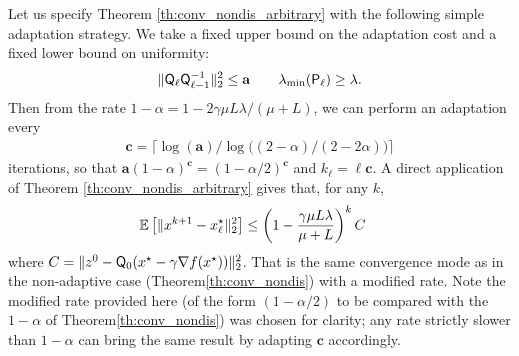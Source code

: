 \begin{example} \label{ex:adapt_fixed}
Let us specify Theorem \eqref{th:conv_nondis_arbitrary} with the following simple adaptation strategy. We take a fixed upper bound on the adaptation cost and a fixed lower bound on uniformity:
\begin{equation}\label{eq:explicit}
\|  {\mathsf{Q}}_\ell   {\mathsf{Q}}_{\ell-1}^{-1} \|_2^2 \leq \mathbf{a} \qquad
\lambda_{ \min}({\mathsf{P}}_{\ell}) \geq \lambda.
\end{equation}
Then from the rate $1-\alpha = 1- 2\gamma\mu L\lambda/(\mu+L)$, we can perform an adaptation every 
\begin{align}
    \label{eq:min_adapt}
\mathbf{c} = \lceil \log(\mathbf{a})/\log\big((2-\alpha)/(2-2\alpha)\big)\rceil
\end{align}
 iterations, so that $\mathbf{a}(1-\alpha)^\mathbf{c} = (1-\alpha/2)^\mathbf{c}$ and $k_\ell = \ell \mathbf{c}$. A direct application of Theorem \eqref{th:conv_nondis_arbitrary} gives that, for any $k$,
 \begin{align*}
    \mathbb{E}\left[\|x^{k+1}-x^{\star}_{\ell}\|_2^2\right] &\leq  \left(1-\frac{\gamma\mu L\lambda}{\mu+L}\right)^{k}  C
\end{align*}
where $C = \|z^0 - {\mathsf{Q}}_0(x^\star - \gamma\nabla f(x^\star))\|_2^2$. That is the same convergence mode as in the non-adaptive case (Theorem\;\ref{th:conv_nondis}) with a modified rate. Note the modified rate provided here (of the form $(1-\alpha/2)$ to be compared with the $1-\alpha$ of Theorem\;\ref{th:conv_nondis}) was chosen for clarity; any rate strictly slower than $1-\alpha$ can bring the same result by adapting $\mathbf{c}$ accordingly.
\end{example}



